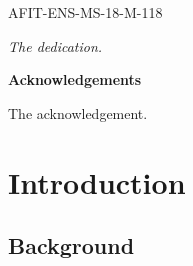 \documentclass[12pt,letterpaper,toc=flat,oneside]{report}
\theoremstyle{definition}
\theoremstyle{definition}
\theoremstyle{definition}
\theoremstyle{remark}
\begin{document}
       \noindent 
       AFIT-ENS-MS-18-M-118
       \vfill
       \begin{center}
	   \em{The dedication.}
	   \end{center}
	   \vfill
      \newpage
\thispagestyle{plain}
    \begin{center}
	\Large\bfseries Acknowledgements
    \end{center}
    \vspace{3em}
    The acknowledgement.
 \newpage
\renewcommand\contentsname{\centering \Large Table of Contents}
\singlespace
\tableofcontents
\newpage
\renewcommand\listtablename{\centering \Large List of Tables}
\listoftables
\newpage
\renewcommand\listfigurename{\centering \Large List of Figures}
\listoffigures
\newpage
\setcounter{chapter}{0}
\doublespacing
\setcounter{page}{1}
	\renewcommand{\thepage}{\arabic{page}}
\hypertarget{introduction}{%
\chapter{Introduction}\label{introduction}}

\hypertarget{background}{%
\section{Background}\label{background}}
\end{document}

